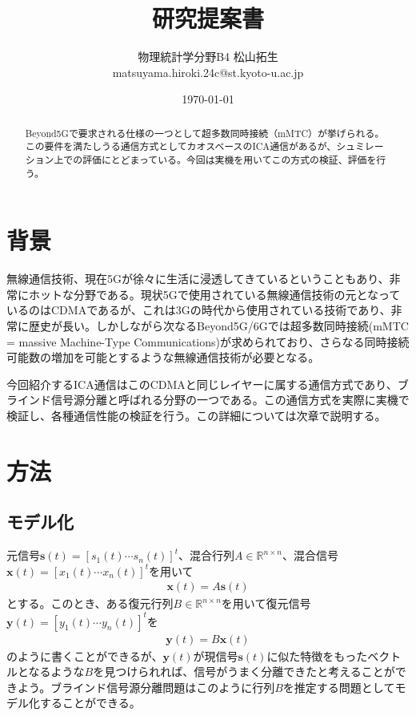 \documentclass{jsarticle}
\title{研究提案書}
\author{物理統計学分野B4 松山拓生 \\ matsuyama.hiroki.24c@st.kyoto-u.ac.jp}
\date{\today}
\begin{document}
\maketitle

\begin{abstract}
Beyond5Gで要求される仕様の一つとして超多数同時接続（mMTC）が挙げられる。この要件を満たしうる通信方式としてカオスベースのICA通信があるが、シュミレーション上での評価にとどまっている。今回は実機を用いてこの方式の検証、評価を行う。
\end{abstract} 

\section{背景}
無線通信技術、現在5Gが徐々に生活に浸透してきているということもあり、非常にホットな分野である。現状5Gで使用されている無線通信技術の元となっているのはCDMA\cite{cdma-overview}であるが、これは3Gの時代から使用されている技術であり、非常に歴史が長い。しかしながら次なるBeyond5G/6Gでは超多数同時接続\cite{mmtc}(mMTC = massive Machine-Type Communications)が求められており、さらなる同時接続可能数の増加を可能とするような無線通信技術が必要となる。

今回紹介するICA通信\cite{red-book}はこのCDMAと同じレイヤーに属する通信方式であり、ブラインド信号源分離と呼ばれる分野の一つである。この通信方式を実際に実機で検証し、各種通信性能の検証を行う。この詳細については次章で説明する。

\section{方法}
\subsection{モデル化}
元信号$\textbf{s}(t) = [s_1(t) \cdots s_n(t)]^t$、混合行列$A\in \mathbb{R}^{n\times n}$、混合信号$\textbf{x}(t) = [x_1(t) \cdots x_n(t)]^t$を用いて
\begin{gather}
    \textbf{x}(t) = A\textbf{s}(t)
\end{gather}
とする。このとき、ある復元行列$B\in \mathbb{R}^{n\times n}$を用いて復元信号$\textbf{y}(t)= [y_1(t) \cdots y_n(t)]^t$を
\begin{gather}
    \textbf{y}(t) = B\textbf{x}(t)
\end{gather}
のように書くことができるが、$\textbf{y}(t)$が現信号$\textbf{s}(t)$に似た特徴をもったベクトルとなるような$B$を見つけられれば、信号がうまく分離できたと考えることができよう。ブラインド信号源分離問題はこのように行列$B$を推定する問題としてモデル化することができる。
\end{document}
